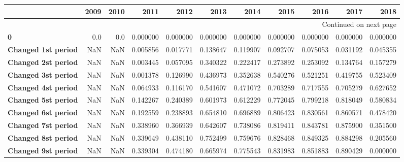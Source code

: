 \begin{longtable}{lrrrrrrrrrr}
\toprule
{} &  2009 &  2010 &         2011 &          2012 &          2013 &          2014 &          2015 &          2016 &         2017 &         2018 \\
\midrule
\endhead
\midrule
\multicolumn{11}{r}{{Continued on next page}} \\
\midrule
\endfoot

\bottomrule
\endlastfoot
\textbf{0                                 } &   0.0 &   0.0 &     0.000000 &      0.000000 &      0.000000 &      0.000000 &      0.000000 &      0.000000 &     0.000000 &     0.000000 \\
\textbf{Changed 1st period                } &   NaN &   NaN &     0.005856 &      0.017771 &      0.138647 &      0.119907 &      0.092707 &      0.075053 &     0.031192 &     0.045355 \\
\textbf{Changed 2st period                } &   NaN &   NaN &     0.003445 &      0.057095 &      0.340322 &      0.222417 &      0.273892 &      0.253092 &     0.134764 &     0.157279 \\
\textbf{Changed 3st period                } &   NaN &   NaN &     0.001378 &      0.126990 &      0.436973 &      0.352638 &      0.540276 &      0.521251 &     0.419755 &     0.523409 \\
\textbf{Changed 4st period                } &   NaN &   NaN &     0.064933 &      0.116170 &      0.541607 &      0.471072 &      0.703289 &      0.717555 &     0.705279 &     0.627652 \\
\textbf{Changed 5st period                } &   NaN &   NaN &     0.142267 &      0.240389 &      0.601973 &      0.612229 &      0.772045 &      0.799218 &     0.818049 &     0.580834 \\
\textbf{Changed 6st period                } &   NaN &   NaN &     0.192559 &      0.238893 &      0.654810 &      0.696889 &      0.806423 &      0.830561 &     0.860571 &     0.478420 \\
\textbf{Changed 7st period                } &   NaN &   NaN &     0.338960 &      0.366939 &      0.642607 &      0.738086 &      0.819411 &      0.843781 &     0.875900 &     0.351500 \\
\textbf{Changed 8st period                } &   NaN &   NaN &     0.339649 &      0.438110 &      0.752499 &      0.759676 &      0.828468 &      0.849325 &     0.884298 &     0.205560 \\
\textbf{Changed 9st period                } &   NaN &   NaN &     0.339304 &      0.474180 &      0.665974 &      0.775543 &      0.831983 &      0.851883 &     0.890429 &     0.000000 \\

\end{longtable}
